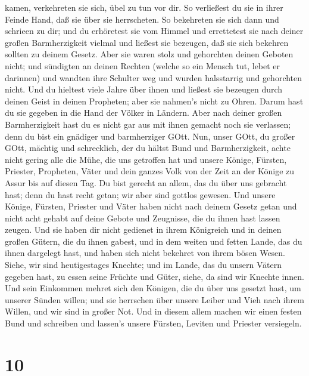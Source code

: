 kamen, verkehreten sie sich, übel zu tun vor dir. So verließest du sie
in ihrer Feinde Hand, daß sie über sie herrscheten. So bekehreten sie
sich dann und schrieen zu dir; und du erhöretest sie vom Himmel und
errettetest sie nach deiner großen Barmherzigkeit vielmal 
und ließest sie bezeugen, daß sie sich bekehren sollten zu deinem
Gesetz. Aber sie waren stolz und gehorchten deinen Geboten nicht; und
sündigten an deinen Rechten (welche so ein Mensch tut, lebet er
darinnen) und wandten ihre Schulter weg und wurden halsstarrig und
gehorchten nicht.  Und du hieltest viele Jahre über ihnen
und ließest sie bezeugen durch deinen Geist in deinen Propheten; aber
sie nahmen's nicht zu Ohren. Darum hast du sie gegeben in die Hand der
Völker in Ländern.  Aber nach deiner großen Barmherzigkeit
hast du es nicht gar aus mit ihnen gemacht noch sie verlassen; denn du
bist ein gnädiger und barmherziger GOtt.  Nun, unser GOtt,
du großer GOtt, mächtig und schrecklich, der du hältst Bund und
Barmherzigkeit, achte nicht gering alle die Mühe, die uns getroffen hat
und unsere Könige, Fürsten, Priester, Propheten, Väter und dein ganzes
Volk von der Zeit an der Könige zu Assur bis auf diesen Tag.
 Du bist gerecht an allem, das du über uns gebracht hast;
denn du hast recht getan; wir aber sind gottlos gewesen. 
Und unsere Könige, Fürsten, Priester und Väter haben nicht nach deinem
Gesetz getan und nicht acht gehabt auf deine Gebote und Zeugnisse, die
du ihnen hast lassen zeugen.  Und sie haben dir nicht
gedienet in ihrem Königreich und in deinen großen Gütern, die du ihnen
gabest, und in dem weiten und fetten Lande, das du ihnen dargelegt hast,
und haben sich nicht bekehret von ihrem bösen Wesen. 
Siehe, wir sind heutigestages Knechte; und im Lande, das du unsern
Vätern gegeben hast, zu essen seine Früchte und Güter, siehe, da sind
wir Knechte innen.  Und sein Einkommen mehret sich den
Königen, die du über uns gesetzt hast, um unserer Sünden willen; und sie
herrschen über unsere Leiber und Vieh nach ihrem Willen, und wir sind in
großer Not.  Und in diesem allem machen wir einen festen
Bund und schreiben und lassen's unsere Fürsten, Leviten und Priester
versiegeln.

\hypertarget{section-9}{%
\section{10}\label{section-9}}

